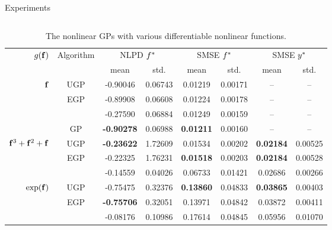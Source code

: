 \documentclass[final]{beamer}
\newlength{\onecolwid}
\newlength{\twocolwid}
\begin{document}
\begin{frame}[t]
\begin{columns}[t]
\begin{column}{\twocolwid}
\vspace{-1.5cm}


\begin{columns}[t,totalwidth=\twocolwid] %

\begin{column}{\twocolwid}


\begin{block}{Experiments}

\begin{columns}
\column{0.5\twocolwid}

\begin{table}[tb]
    \centering
    \tiny
    \caption[]{The nonlinear GPs with various differentiable nonlinear functions.}
    \begin{tabular}{r|c| c c c c c c}
        \multirow{2}{*}{$g\!\left({{\mathbf{f}}}\right)$} & \multirow{2}{*}{Algorithm} & 
            \multicolumn{2}{c}{NLPD $f^{*}$} &
            \multicolumn{2}{c}{SMSE $f^{*}$} &
            \multicolumn{2}{c}{SMSE $y^{*}$} \\
        & & mean & std. & mean & std. & mean & std.\\
        \toprule
        $\mathbf{f}$ 
& UGP & -0.90046 & 0.06743 & 0.01219 & 0.00171 & -- & -- \\
& EGP & -0.89908 & 0.06608 & 0.01224 & 0.00178 & -- & -- \\
& \cite{Opper2009} & -0.27590 & 0.06884 & 0.01249 & 0.00159 & -- & -- \\
& GP & \textbf{-0.90278} & 0.06988 & \textbf{0.01211} & 0.00160 & -- & -- \\
        \midrule
        $\mathbf{f}^3 + \mathbf{f}^2 + \mathbf{f}$ 
& UGP & \textbf{-0.23622} & 1.72609 & 0.01534 & 0.00202 & \textbf{0.02184} & 0.00525 \\
& EGP & -0.22325 & 1.76231 & \textbf{0.01518} & 0.00203 & \textbf{0.02184} & 0.00528 \\
& \cite{Opper2009} & -0.14559 & 0.04026 & 0.06733 & 0.01421 & 0.02686 & 0.00266 \\
        \midrule
        $\exp\!\left({\mathbf{f}}\right)$ 
& UGP & -0.75475 & 0.32376 & \textbf{0.13860} & 0.04833 & \textbf{0.03865} & 0.00403 \\
& EGP & \textbf{-0.75706} & 0.32051 & 0.13971 & 0.04842 & 0.03872 & 0.00411 \\
& \cite{Opper2009} & -0.08176 & 0.10986 & 0.17614 & 0.04845 & 0.05956 & 0.01070 \\

\end{tabular}
\end{table}
\end{columns}
\end{block}
\end{column}
\end{columns}
\end{column}
\end{columns}
\end{frame}
\end{document}
